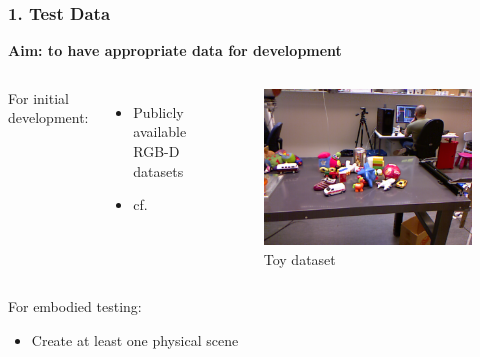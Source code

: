 
\begin{frame}[t] \frametitle{1. Test Data}

	\textbf{Aim: to have appropriate data for development}

	\vfill

	\onslide<+->
	{

	\begin{columns}[c]

		For initial development:

		\begin{itemize}\itemsep10pt
			\item Publicly available RGB-D datasets
			\item cf. \cite{firman2016}
		\end{itemize}

		\begin{figure}
		\includegraphics[width=\linewidth]{src/toydataset.png}
		\caption{Toy dataset \cite{ikkala2016}}
		\end{figure}

	\end{columns}

	}

	\vfill

	\onslide<+->
	{

	For embodied testing:

	\begin{itemize}\itemsep10pt
		\item Create at least one physical scene
	\end{itemize}

	}

	\vfill

\end{frame}


